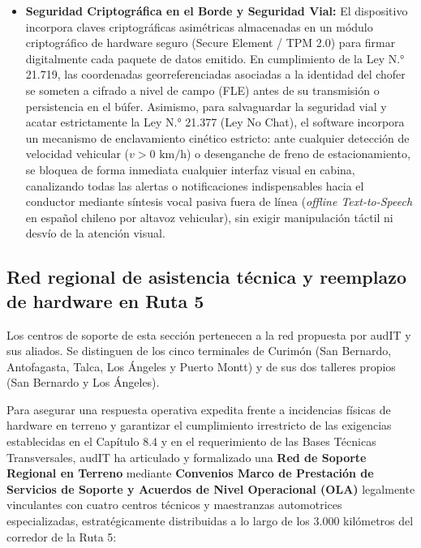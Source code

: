 \begin{itemize}
  \item \textbf{Seguridad Criptográfica en el Borde y Seguridad Vial:} El dispositivo incorpora claves criptográficas asimétricas almacenadas en un módulo criptográfico de hardware seguro (Secure Element / TPM 2.0) para firmar digitalmente cada paquete de datos emitido. En cumplimiento de la Ley N.° 21.719, las coordenadas georreferenciadas asociadas a la identidad del chofer se someten a cifrado a nivel de campo (FLE) antes de su transmisión o persistencia en el búfer. Asimismo, para salvaguardar la seguridad vial y acatar estrictamente la Ley N.° 21.377 (Ley No Chat), el software incorpora un mecanismo de enclavamiento cinético estricto: ante cualquier detección de velocidad vehicular ($v > 0\text{ km/h}$) o desenganche de freno de estacionamiento, se bloquea de forma inmediata cualquier interfaz visual en cabina, canalizando todas las alertas o notificaciones indispensables hacia el conductor mediante síntesis vocal pasiva fuera de línea (\textit{offline Text-to-Speech} en español chileno por altavoz vehicular), sin exigir manipulación táctil ni desvío de la atención visual.
\end{itemize}

\subsection{Red regional de asistencia técnica y reemplazo de hardware en Ruta 5}\label{sec:1-red-regional}

Los centros de soporte de esta sección pertenecen a la red propuesta por audIT y sus aliados. Se distinguen de los cinco terminales de Curimón (San Bernardo, Antofagasta, Talca, Los Ángeles y Puerto Montt) y de sus dos talleres propios (San Bernardo y Los Ángeles).


Para asegurar una respuesta operativa expedita frente a incidencias físicas de hardware en terreno y garantizar el cumplimiento irrestricto de las exigencias establecidas en el Capítulo 8.4 y en el requerimiento  de las Bases Técnicas Transversales, audIT ha articulado y formalizado una \textbf{Red de Soporte Regional en Terreno} mediante \textbf{Convenios Marco de Prestación de Servicios de Soporte y Acuerdos de Nivel Operacional (OLA)} legalmente vinculantes con cuatro centros técnicos y maestranzas automotrices especializadas, estratégicamente distribuidas a lo largo de los 3.000 kilómetros del corredor de la Ruta 5:

